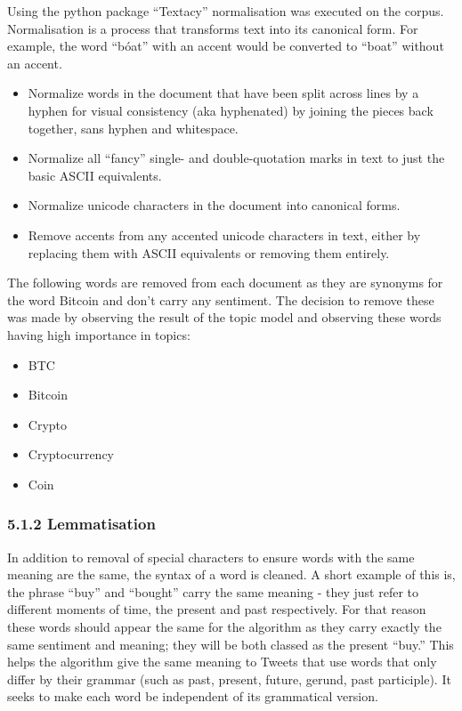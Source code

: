 \documentclass[
]{article}
\providecommand{\tightlist}{%
  \setlength{\itemsep}{0pt}\setlength{\parskip}{0pt}}
\begin{document}
Using the python package ``Textacy'' normalisation was executed on the
corpus. Normalisation is a process that transforms text into its
canonical form. For example, the word ``bóat'' with an accent would be
converted to ``boat'' without an accent.

\begin{itemize}
\tightlist
\item
  Normalize words in the document that have been split across lines by a
  hyphen for visual consistency (aka hyphenated) by joining the pieces
  back together, sans hyphen and whitespace.
\item
  Normalize all ``fancy'' single- and double-quotation marks in text to
  just the basic ASCII equivalents.
\item
  Normalize unicode characters in the document into canonical forms.
\item
  Remove accents from any accented unicode characters in text, either by
  replacing them with ASCII equivalents or removing them entirely.
\end{itemize}

The following words are removed from each document as they are synonyms
for the word Bitcoin and don't carry any sentiment. The decision to
remove these was made by observing the result of the topic model and
observing these words having high importance in topics:

\begin{itemize}
\tightlist
\item
  BTC
\item
  Bitcoin
\item
  Crypto
\item
  Cryptocurrency
\item
  Coin
\end{itemize}

\hypertarget{lemmatisation}{%
\subsubsection{5.1.2 Lemmatisation}\label{lemmatisation}}

In addition to removal of special characters to ensure words with the
same meaning are the same, the syntax of a word is cleaned. A short
example of this is, the phrase ``buy'' and ``bought'' carry the same
meaning - they just refer to different moments of time, the present and
past respectively. For that reason these words should appear the same
for the algorithm as they carry exactly the same sentiment and meaning;
they will be both classed as the present ``buy.'' This helps the
algorithm give the same meaning to Tweets that use words that only
differ by their grammar (such as past, present, future, gerund, past
participle). It seeks to make each word be independent of its
grammatical version.
\end{document}
